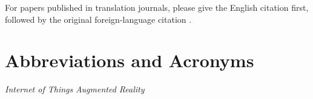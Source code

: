 \documentclass[conference]{IEEEtran}
\begin{document}
For papers published in translation journals, please give the English 
citation first, followed by the original foreign-language citation \cite{olteanu2018consensual}.

\section*{Abbreviations and Acronyms}
\begin{acronym}[Bash]
 {\textit{Internet of Things}}
 {\textit{Augmented Reality}}
\end{acronym}


{\footnotesize
}
\end{document}
